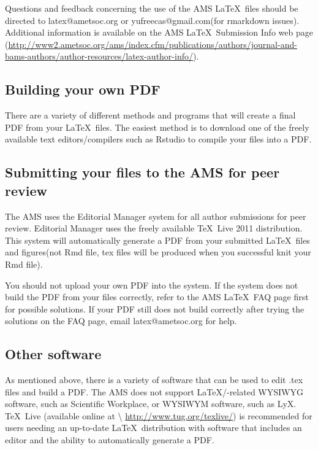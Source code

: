 \documentclass[draft]{ametsoc}
\begin{document}
Questions and feedback concerning the use of the AMS \LaTeX~files should
be directed to latex@ametsoc.org or yufreecas@gmail.com(for rmarkdown
issues). Additional information is available on the AMS
\LaTeX~Submission Info web page
(\url{http://www2.ametsoc.org/ams/index.cfm/publications/authors/journal-and-bams-authors/author-resources/latex-author-info/}).

\appendix[C]

\hypertarget{building-your-own-pdf}{%
\subsection{Building your own PDF}\label{building-your-own-pdf}}

There are a variety of different methods and programs that will create a
final PDF from your \LaTeX~files. The easiest method is to download one
of the freely available text editors/compilers such as Rstudio to
compile your files into a PDF.

\hypertarget{submitting-your-files-to-the-ams-for-peer-review}{%
\subsection{Submitting your files to the AMS for peer
review}\label{submitting-your-files-to-the-ams-for-peer-review}}

The AMS uses the Editorial Manager system for all author submissions for
peer review. Editorial Manager uses the freely available \TeX~Live 2011
distribution. This system will automatically generate a PDF from your
submitted \LaTeX~files and figures(not Rmd file, tex files will be
produced when you successful knit your Rmd file).

You should not upload your own PDF into the system. If the system does
not build the PDF from your files correctly, refer to the AMS \LaTeX~FAQ
page first for possible solutions. If your PDF still does not build
correctly after trying the solutions on the FAQ page, email
latex@ametsoc.org for help.

\hypertarget{other-software}{%
\subsection{Other software}\label{other-software}}

As mentioned above, there is a variety of software that can be used to
edit .tex files and build a PDF. The AMS does not support
\LaTeX/-related WYSIWYG software, such as Scientific Workplace, or
WYSIWYM software, such as LyX. \TeX~Live (available online at
\textbackslash{} \url{http://www.tug.org/texlive/}) is recommended for
users needing an up-to-date \LaTeX~distribution with software that
includes an editor and the ability to automatically generate a PDF.
\end{document}
